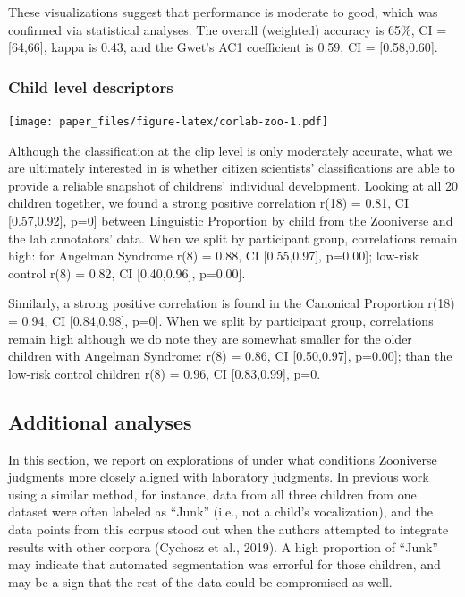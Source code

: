 \documentclass[english,,man,floatsintext]{apa6}
\begin{document}
These visualizations suggest that performance is moderate to good, which was confirmed via statistical analyses. The overall (weighted) accuracy is 65\%, CI = {[}64,66{]}, kappa is 0.43, and the Gwet's AC1 coefficient is 0.59, CI = {[}0.58,0.60{]}.

\hypertarget{child-level-descriptors}{%
\subsubsection{Child level descriptors}\label{child-level-descriptors}}

\texttt{[image: paper\_files/figure-latex/corlab-zoo-1.pdf]}

Although the classification at the clip level is only moderately accurate, what we are ultimately interested in is whether citizen scientists' classifications are able to provide a reliable snapshot of childrens' individual development. Looking at all 20 children together, we found a strong positive correlation r(18) = 0.81, CI {[}0.57,0.92{]}, p=0{]} between Linguistic Proportion by child from the Zooniverse and the lab annotators' data. When we split by participant group, correlations remain high: for Angelman Syndrome r(8) = 0.88, CI {[}0.55,0.97{]}, p=0.00{]}; low-risk control r(8) = 0.82, CI {[}0.40,0.96{]}, p=0.00{]}.

Similarly, a strong positive correlation is found in the Canonical Proportion r(18) = 0.94, CI {[}0.84,0.98{]}, p=0{]}. When we split by participant group, correlations remain high although we do note they are somewhat smaller for the older children with Angelman Syndrome: r(8) = 0.86, CI {[}0.50,0.97{]}, p=0.00{]}; than the low-risk control children r(8) = 0.96, CI {[}0.83,0.99{]}, p=0.

\hypertarget{additional-analyses}{%
\subsection{Additional analyses}\label{additional-analyses}}

In this section, we report on explorations of under what conditions Zooniverse judgments more closely aligned with laboratory judgments. In previous work using a similar method, for instance, data from all three children from one dataset were often labeled as \enquote{Junk} (i.e., not a child's vocalization), and the data points from this corpus stood out when the authors attempted to integrate results with other corpora (Cychosz et al., 2019). A high proportion of \enquote{Junk} may indicate that automated segmentation was errorful for those children, and may be a sign that the rest of the data could be compromised as well.
\end{document}
